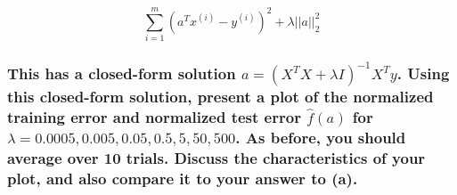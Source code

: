 \documentclass[11pt]{article}
\begin{document}
\[\sum_{i=1}^m{(a^Tx^{(i)}-y^{(i)})^2+\lambda ||a||^2_2}\]

\subsubsection{\texorpdfstring{This has a closed-form solution
\(a=(X^TX+\lambda I)^{-1}X^Ty\). Using this closed-form solution,
present a plot of the normalized training error and normalized test
error \(\hat{f}(a)\) for
\(\lambda = {0.0005, 0.005, 0.05, 0.5, 5, 50, 500}\). As before, you
should average over 10 trials. Discuss the characteristics of your plot,
and also compare it to your answer to
(a).}{This has a closed-form solution a=(X\^{}TX+\textbackslash{}lambda I)\^{}\{-1\}X\^{}Ty. Using this closed-form solution, present a plot of the normalized training error and normalized test error \textbackslash{}hat\{f\}(a) for \textbackslash{}lambda = \{0.0005, 0.005, 0.05, 0.5, 5, 50, 500\}. As before, you should average over 10 trials. Discuss the characteristics of your plot, and also compare it to your answer to (a).}}\label{this-has-a-closed-form-solution-axtxlambda-i-1xty.-using-this-closed-form-solution-present-a-plot-of-the-normalized-training-error-and-normalized-test-error-hatfa-for-lambda-0.0005-0.005-0.05-0.5-5-50-500.-as-before-you-should-average-over-10-trials.-discuss-the-characteristics-of-your-plot-and-also-compare-it-to-your-answer-to-a.}
\end{document}
